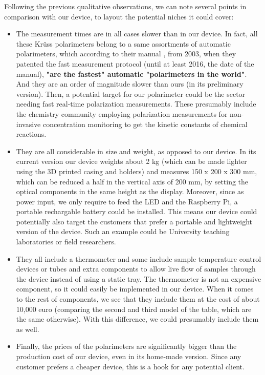 \documentclass[11pt, a4paper, twoside]{article} %
\begin{document}
Following the previous qualitative observations, we can note several points in comparison with our device, to layout the potential niches it could cover:\vspace{-0.2cm}
\begin{itemize}
\item The measurement times are in all cases slower than in our device. In fact, all these Krüss polarimeters belong to a same assortments of automatic polarimeters, which according to their manual \cite{manual}, from 2003, when they patented the fast measurement protocol (until at least 2016, the date of the manual), {\bf "are the fastest" automatic "polarimeters in the world"}. And they are an order of magnitude slower than ours (in its preliminary version). Then, a potential target for our polarimeter could be the sector needing fast real-time polarization measurements. These presumably include the chemistry community employing polarization measurements for non-invasive concentration monitoring to get the kinetic constants of chemical reactions.

\item They are all considerable in size and weight, as opposed to our device. In its current version our device weights about 2 kg (which can be made lighter using the 3D printed casing and holders) and measures 150 x 200 x 300 mm, which can be reduced a half in the vertical axis of 200 mm, by setting the optical components in the same height as the display. Moreover, since as power input, we only require to feed the LED and the Raspberry Pi, a portable rechargable battery could be installed. This means our device could potentially also target the customers that prefer a portable and lightweight version of the device. Such an example could be University teaching laboratories or field researchers.


\item They all include a thermometer and some include sample temperature control devices or tubes and extra components to allow live flow of samples through the device instead of using a static tray. The thermometer is not an expensive component, so it could easily be implemented in our device. When it comes to the rest of components, we see that they include them at the cost of about 10,000 euro (comparing the second and third model of the table, which are the same otherwise). With this difference, we could presumably include them as well.

\item Finally, the prices of the polarimeters are significantly bigger than the production cost of our device, even in its home-made version. Since any customer prefers a cheaper device, this is a hook for any potential client.\vspace{-0.1cm}
\end{itemize} 
\end{document}

